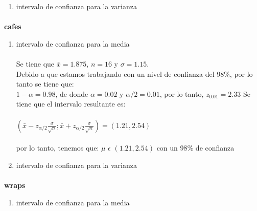 \documentclass{article}
\begin{document}
\begin{enumerate}
\begin{enumerate}{}
      \item {intervalo de confianza para la varianza}
      \paragraph{}
  \end{enumerate}
  \paragraph*{}\textbf{cafes}\\
    \begin{enumerate}{}
       
      \item{intervalo de confianza para la media}
          \paragraph{}Se tiene que $\bar{x}=1.875$, $n=16$ y $\sigma=1.15$.\\
          Debido a que estamos trabajando con un nivel de confianza del 98\%, por lo tanto se tiene que:\\ 
          $1-\alpha=0.98$, de donde $\alpha=0.02 $ y $\alpha/2=0.01$, por lo tanto, $z_{0.01}=2.33$ 
          Se tiene que el intervalo resultante es: \\\\
          $(\bar{x}-z_{\alpha/2}\frac{\sigma}{\sqrt{n}};\bar{x}+z_{\alpha/2}\frac{\sigma}{\sqrt{n}})=(1.21,2.54)$\\\\
          por lo tanto, tenemos que: $\mu$ $\epsilon$ $(1.21,2.54)$ con un 98\% de confianza
      
      \item {intervalo de confianza para la varianza}
      \paragraph{}
  \end{enumerate}
  \paragraph*{}\textbf{wraps}\\
    \begin{enumerate}{}
       
      \item{intervalo de confianza para la media}

\end{enumerate}
\end{enumerate}
\end{document}
